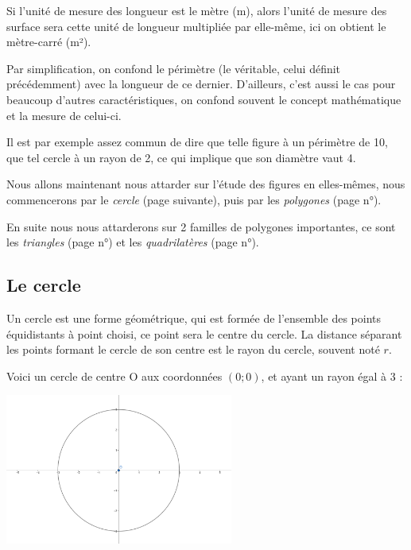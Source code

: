 \documentclass[a4paper, twoside]{article}
\begin{document}
Si l'unité de mesure des longueur est le mètre (m), alors l'unité de mesure des surface sera
cette unité de longueur multipliée par elle-même, ici on obtient le mètre-carré (m²).

\medbreak

Par simplification, on confond le périmètre (le véritable, celui définit précédemment) avec la longueur de ce dernier.
D'ailleurs, c'est aussi le cas pour beaucoup d'autres caractéristiques,
on confond souvent le concept mathématique et la mesure de celui-ci.

Il est par exemple assez commun de dire que telle figure à un périmètre de 10,
que tel cercle à un rayon de 2, ce qui implique que son diamètre vaut 4.

\medbreak

Nous allons maintenant nous attarder sur l'étude des figures en elles-mêmes,
nous commencerons par le \emph{cercle} (page suivante), puis par les \emph{polygones} (page n°\pageref{polygones}).

En suite nous nous attarderons sur 2 familles de polygones importantes,
ce sont les \emph{triangles} (page n°\pageref{triangles}) et les \emph{quadrilatères} (page n°\pageref{quadrilateres}).

\newpage

\subsection{Le cercle}

Un cercle est une forme géométrique, qui est formée de l'ensemble des points équidistants
à point choisi, ce point sera le centre du cercle.
La distance séparant les points formant le cercle de son centre est le rayon du cercle,
souvent noté $r$.

Voici un cercle de centre O aux coordonnées $(0;0)$, et ayant un rayon égal à 3 :

\begin{center}
	\includegraphics[width=7.5cm]{Image/cercle_centre_O_rayon_3.png}
\end{center}
\end{document}
